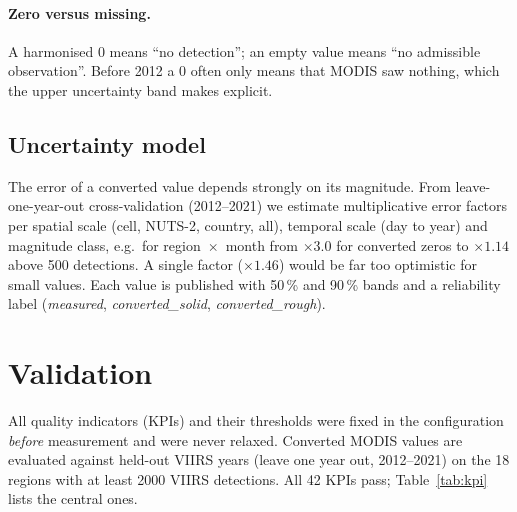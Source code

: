 \documentclass[11pt,a4paper]{article}
\begin{document}
\paragraph{Zero versus missing.}
A harmonised 0 means ``no detection''; an empty value means ``no admissible observation''. Before 2012 a 0
often only means that MODIS saw nothing, which the upper uncertainty band makes explicit.

\subsection{Uncertainty model}
The error of a converted value depends strongly on its magnitude. From leave-one-year-out
cross-validation (2012--2021) we estimate multiplicative error factors per spatial scale (cell, NUTS-2,
country, all), temporal scale (day to year) and magnitude class, e.g.\ for region~$\times$~month from
$\times 3.0$ for converted zeros to $\times 1.14$ above 500 detections. A single factor ($\times 1.46$)
would be far too optimistic for small values. Each value is published with 50\,\% and 90\,\% bands and a
reliability label (\emph{measured}, \emph{converted\_solid}, \emph{converted\_rough}).

\section{Validation}\label{sec:validation}

All quality indicators (KPIs) and their thresholds were fixed in the configuration \emph{before}
measurement and were never relaxed. Converted MODIS values are evaluated against held-out VIIRS years
(leave one year out, 2012--2021) on the 18 regions with at least \num{2000} VIIRS detections. All 42 KPIs
pass; Table~\ref{tab:kpi} lists the central ones.
\end{document}
